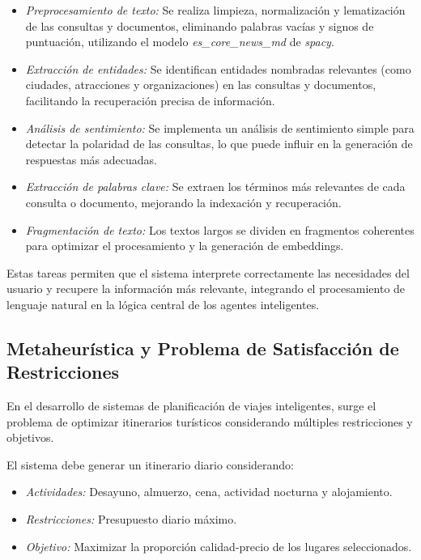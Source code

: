 \documentclass[10pt]{llncs}
\begin{document}
\begin{itemize}
    \item \textit{Preprocesamiento de texto:} Se realiza limpieza, normalización y lematización de las consultas y documentos, eliminando palabras vacías y signos de puntuación, utilizando el modelo \textit{es\_core\_news\_md} de \textit{spacy}.
    \item \textit{Extracción de entidades:} Se identifican entidades nombradas relevantes (como ciudades, atracciones y organizaciones) en las consultas y documentos, facilitando la recuperación precisa de información.
    \item \textit{Análisis de sentimiento:} Se implementa un análisis de sentimiento simple para detectar la polaridad de las consultas, lo que puede influir en la generación de respuestas más adecuadas.
    \item \textit{Extracción de palabras clave:} Se extraen los términos más relevantes de cada consulta o documento, mejorando la indexación y recuperación.
    \item \textit{Fragmentación de texto:} Los textos largos se dividen en fragmentos coherentes para optimizar el procesamiento y la generación de embeddings.
\end{itemize}

Estas tareas permiten que el sistema interprete correctamente las necesidades del usuario y recupere la información más relevante, integrando el procesamiento de lenguaje natural en la lógica central de los agentes inteligentes.

\vspace{\baselineskip}

\subsection{Metaheurística y Problema de Satisfacción de Restricciones \cite{Talbi2009}}



En el desarrollo de sistemas de planificación de viajes inteligentes, surge el problema de optimizar itinerarios turísticos considerando múltiples restricciones y objetivos.

El sistema debe generar un itinerario diario considerando:
\begin{itemize}
    \item \textit{Actividades:} Desayuno, almuerzo, cena, actividad nocturna y alojamiento.
    \item \textit{Restricciones:} Presupuesto diario máximo.
    \item \textit{Objetivo:} Maximizar la proporción calidad-precio de los lugares seleccionados.
\end{itemize}
\end{document}
